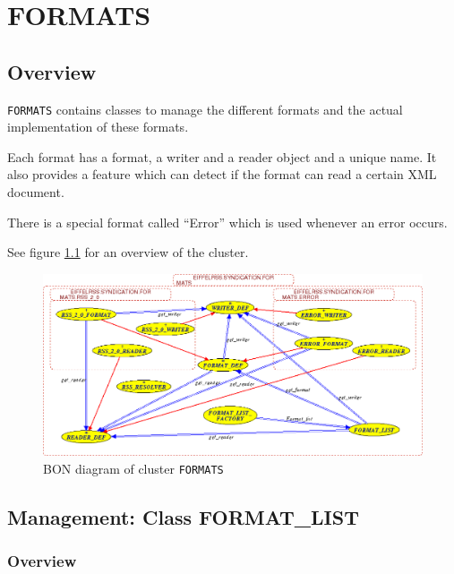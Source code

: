 \part{FORMATS}


\chapter{Overview}
\label{cha:formats-overview}

\texttt{FORMATS} contains classes to manage the different formats and
the actual implementation of these formats.

Each format has a format, a writer and a reader object and a unique
name. It also provides a feature which can detect if the format can
read a certain XML document.

There is a special format called ``Error'' which is used whenever an
error occurs.

See figure \ref{fig:formats} for an overview of the cluster.

\begin{figure}[htbp]
  \centering
  \includegraphics[width=\textwidth]{./figures/EIFFELRSS_SYNDICATION_FORMATS}
  \caption{BON diagram of cluster \texttt{FORMATS}}
  \label{fig:formats}
\end{figure}


\chapter{Management: Class FORMAT\_LIST}
\label{cha:management}


\section{Overview}
\label{sec:management-overview}

